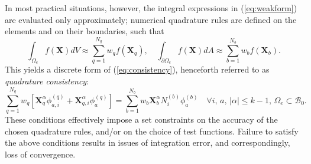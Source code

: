 In most practical situations, however, the integral expressions in (\ref{eq:weakform}) are evaluated only approximately; numerical quadrature rules are defined on the elements and on their boundaries, such that
\begin{equation}
  \int_{\Omega_e} f(\mathbf{X}) dV \approx \sum_{q=1}^{N_q} w_q f(\mathbf{X}_q), \quad \int_{\partial \Omega_e} f(\mathbf{X}) dA \approx \sum_{b=1}^{N_b} w_b f(\mathbf{X}_b).
\end{equation}
This yields a discrete form of (\ref{eq:consistency}), henceforth referred to as \textit{quadrature consistency}:
\begin{equation}
  \sum_{q=1}^{N_q} w_q \left[ \mathbf{X}_q^{\alpha} \phi^{(q)}_{a,i} + \mathbf{X}^{\alpha}_{q,i} \phi^{(q)}_a \right] = \sum_{b=1}^{N_b} w_b \mathbf{X}_b^{\alpha} N^{(b)}_i \phi^{(b)}_a \quad \forall i, \, a, \, | \alpha | \leq k-1, \, \Omega_e \subset \mathcal{B}_0.
  \label{eq:quadrature_consistency}
\end{equation}
These conditions effectively impose a set constraints on the accuracy of the chosen quadrature rules, and/or on the choice of test functions. Failure to satisfy the above conditions results in issues of integration error, and correspondingly, loss of convergence.